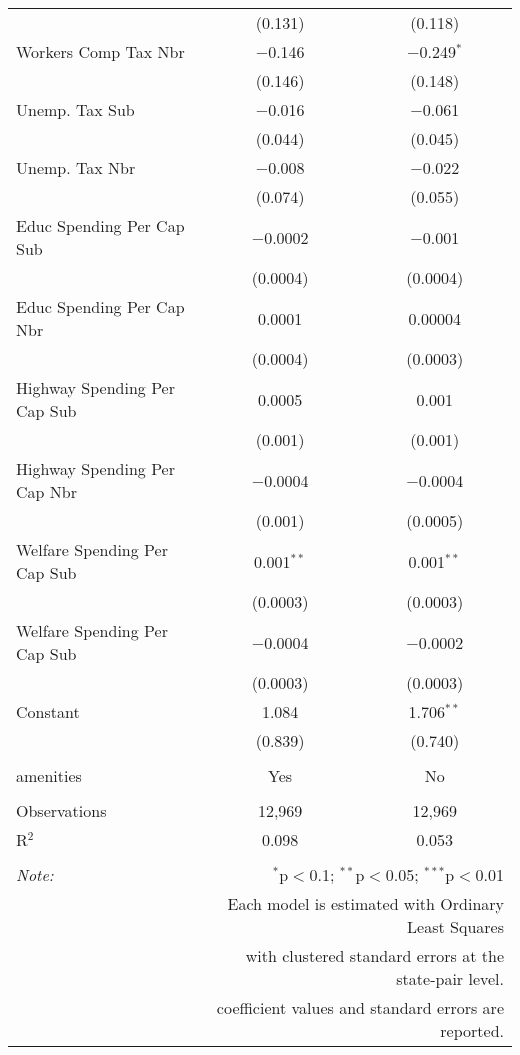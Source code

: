 \begin{table}[!htbp]
\begin{tabular}{@{\extracolsep{5pt}}lcc}
  & (0.131) & (0.118) \\ 
  Workers Comp Tax Nbr & $-$0.146 & $-$0.249$^{*}$ \\ 
  & (0.146) & (0.148) \\ 
  Unemp. Tax Sub & $-$0.016 & $-$0.061 \\ 
  & (0.044) & (0.045) \\ 
  Unemp. Tax Nbr & $-$0.008 & $-$0.022 \\ 
  & (0.074) & (0.055) \\ 
  Educ Spending Per Cap Sub & $-$0.0002 & $-$0.001 \\ 
  & (0.0004) & (0.0004) \\ 
  Educ Spending Per Cap Nbr & 0.0001 & 0.00004 \\ 
  & (0.0004) & (0.0003) \\ 
  Highway Spending Per Cap Sub & 0.0005 & 0.001 \\ 
  & (0.001) & (0.001) \\ 
  Highway Spending Per Cap Nbr & $-$0.0004 & $-$0.0004 \\ 
  & (0.001) & (0.0005) \\ 
  Welfare Spending Per Cap Sub & 0.001$^{**}$ & 0.001$^{**}$ \\ 
  & (0.0003) & (0.0003) \\ 
  Welfare Spending Per Cap Sub & $-$0.0004 & $-$0.0002 \\ 
  & (0.0003) & (0.0003) \\ 
  Constant & 1.084 & 1.706$^{**}$ \\ 
  & (0.839) & (0.740) \\ 
 \hline \\[-1.8ex] 
amenities & Yes & No \\ 
\hline \\[-1.8ex] 
Observations & 12,969 & 12,969 \\ 
R$^{2}$ & 0.098 & 0.053 \\ 
\hline 
\hline \\[-1.8ex] 
\textit{Note:}  & \multicolumn{2}{r}{$^{*}$p$<$0.1; $^{**}$p$<$0.05; $^{***}$p$<$0.01} \\ 
 & \multicolumn{2}{r}{Each model is estimated with Ordinary Least Squares} \\ 
 & \multicolumn{2}{r}{with clustered standard errors at the state-pair level.} \\ 
 & \multicolumn{2}{r}{coefficient values and standard errors are reported.} \\ 
\end{tabular} 
\end{table} 
